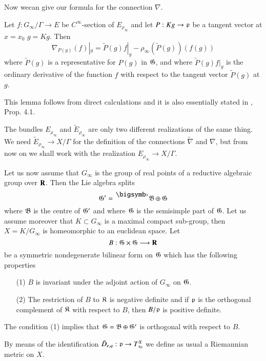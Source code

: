 Now we\pageoriginale can give our formula for the connection $\nabla$.

\setcounter{lemma}{3}
\begin{lemma}\label{art5-lem1.4}
Let $f: G_\infty/ \Gamma \to E$ be $C^\infty$-section of $E_{\rho_\infty}$ and let $P: Kg \to \mathfrak{p}$ be a tangent vector at $x = x_0$ $g = Kg$. Then
$$
\nabla_{P(g)} (f) |_g = \tilde{P} (g) f |_g - \rho_\infty (\tilde{P} (g)) (f(g))
$$
where $\tilde{P}(g)$ is a representative for $P(g)$ in $\mathfrak{G}$, and where $\tilde{P}(g) f|_g$ is the ordinary derivative of the function $f$ with respect to the tangent vector $\tilde{P} (g)$ at $g$.
\end{lemma}

This lemma follows from direct calculations and it is also essentially stated in \cite{art5-key10}, Prop. 4.1.

\begin{remark*}
The bundles $E_{\rho_\infty}$ and $\tilde{E}_{\rho_\infty}$ are only two different realizations of the same thing. We need $\tilde{E}_{\rho_\infty} \to X / \Gamma$ for the definition of the connections $\tilde{\nabla}$ and $\nabla$, but from now on we shall work with the realization $E_{\rho_\infty} \to X / \Gamma$.
\end{remark*}

Let us now assume that $G_\infty$ is the group of real points of a reductive algebraic group over $\mathbf{R}$. Then the Lie algebra splits 
$$
\fG' = {}^\bigdot \fB\oplus \fG
$$
where $\mathfrak{B}$ is the centre of $\mathfrak{G}'$ and where $\mathfrak{G}$ is the semisimple part of $\mathfrak{G}$. Let us assume moreover that $K \subset G_\infty$ is a maximal compact sub-group, then $X = K/ G_\infty$ is homeomorphic to an euclidean space. Let 
$$
B : \mathfrak{G} \times \mathfrak{G} \longrightarrow \mathbf{R}
$$
be a symmetric nondegenerate bilinear form on $\mathfrak{G}$ which has the following properties
\begin{itemize}
\item[(1)] $B$ is invariant under the adjoint action of $G_\infty$ on $\mathfrak{G}$.

\item[(2)] The restriction of $B$ to $\mathfrak{K}$ is negative definite and if $\mathfrak{p}$ is the orthogonal complement of $\mathfrak{K}$ with respect to $B$, then $B / \mathfrak{p}$ is positive definite.
\end{itemize}

The condition (1) implies that $\mathfrak{G} = \mathfrak{B} \oplus \mathfrak{G}'$ is orthogonal with respect to $B$.

By means of the identification $\bar{D}_{e,q} : \mathfrak{p} \to T^X_{x_0}$ we define as usual a Riemannian metric on $X$.

